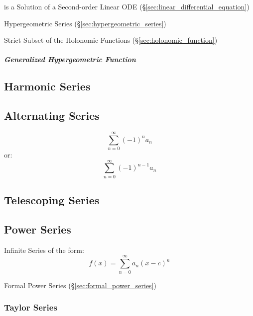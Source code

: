 is a Solution of a Second-order Linear ODE
(\S\ref{sec:linear_differential_equation})

Hypergeometric Series (\S\ref{sec:hypergeometric_series})

Strict Subset of the Holonomic Functions (\S\ref{sec:holonomic_function})



\subparagraph{Generalized Hypergeometric Function}
\label{sec:generalized_hypergeometric_function}\hfill



\subsection{Harmonic Series}\label{sec:harmonic_series}

\subsection{Alternating Series}\label{sec:alternating_series}

\[
  \sum_{n=0}^\infty (-1)^n a_n
\]
or:
\[
  \sum_{n=0}^\infty (-1)^{n-1} a_n
\]



\subsection{Telescoping Series}\label{sec:telescoping_series}

\subsection{Power Series}\label{sec:power_series}

Infinite Series of the form:
\[
  f(x) = \sum_{n=0}^\infty a_n (x - c)^n
\]

\fist Formal Power Series (\S\ref{sec:formal_power_series})



\subsubsection{Taylor Series}\label{sec:taylor_series}

